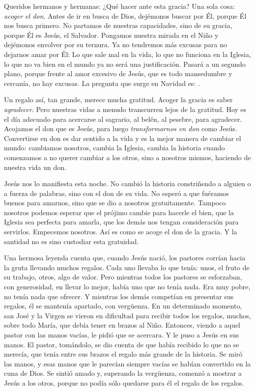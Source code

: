 Queridos hermanos y hermanas: ¿Qué hacer ante esta gracia? Una sola cosa: \emph{acoger el don}. Antes de ir en busca de Dios, dejémonos buscar por Él, porque Él nos busca primero. No partamos de nuestras capacidades, sino de su gracia, porque Él es Jesús, el Salvador. Pongamos nuestra mirada en el Niño y dejémonos envolver por su ternura. Ya no tendremos más excusas para no dejarnos amar por Él: Lo que sale mal en la vida, lo que no funciona en la Iglesia, lo que no va bien en el mundo ya no será una justificación. Pasará a un segundo plano, porque frente al amor excesivo de Jesús, que es todo mansedumbre y cercanía, no hay excusas. La pregunta que surge en Navidad es: .

Un regalo así, tan grande, merece mucha gratitud. Acoger la gracia es saber \emph{agradecer}. Pero nuestras vidas a menudo transcurren lejos de la gratitud. Hoy es el día adecuado para acercarse al sagrario, al belén, al pesebre, para agradecer. Acojamos el don que es Jesús, para luego \emph{transformarnos en don} como Jesús. Convertirse en don es dar sentido a la vida y es la mejor manera de cambiar el mundo: cambiamos nosotros, cambia la Iglesia, cambia la historia cuando comenzamos a no querer cambiar a los otros, sino a nosotros mismos, haciendo de nuestra vida un don.

Jesús nos lo manifiesta esta noche. No cambió la historia constriñendo a alguien o a fuerza de palabras, sino con el don de su vida. No esperó a que fuéramos buenos para amarnos, sino que se dio a nosotros gratuitamente. Tampoco nosotros podemos esperar que el prójimo cambie para hacerle el bien, que la Iglesia sea perfecta para amarla, que los demás nos tengan consideración para servirlos. Empecemos nosotros. Así es como se acoge el don de la gracia. Y la santidad no es sino custodiar esta gratuidad.

Una hermosa leyenda cuenta que, cuando Jesús nació, los pastores corrían hacia la gruta llevando muchos regalos. Cada uno llevaba lo que tenía: unos, el fruto de su trabajo, otros, algo de valor. Pero mientras todos los pastores se esforzaban, con generosidad, en llevar lo mejor, había uno que no tenía nada. Era muy pobre, no tenía nada que ofrecer. Y mientras los demás competían en presentar sus regalos, él se mantenía apartado, con vergüenza. En un determinado momento, san José y la Virgen se vieron en dificultad para recibir todos los regalos, muchos, sobre todo María, que debía tener en brazos al Niño. Entonces, viendo a aquel pastor con las manos vacías, le pidió que se acercara. Y le puso a Jesús en sus manos. El pastor, tomándolo, se dio cuenta de que había recibido lo que no se merecía, que tenía entre sus brazos el regalo más grande de la historia. Se miró las manos, y esas manos que le parecían siempre vacías se habían convertido en la cuna de Dios. Se sintió amado y, superando la vergüenza, comenzó a mostrar a Jesús a los otros, porque no podía sólo quedarse para él el regalo de los regalos.


